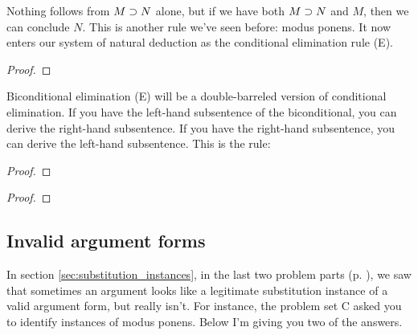 Nothing follows from $M\supset N$ alone, but if we have both $M \supset N$ and $M$, then we can conclude $N$. This is another rule we've seen before: modus ponens. It now enters our system of 
natural deduction as the conditional elimination rule ({\eif}E).

\begin{proof}
	 
\end{proof}

Biconditional elimination ({\eiff}E) will be a double-barreled version of conditional elimination. If you have the left-hand subsentence of the biconditional, you can derive the 
right-hand subsentence. If you have the right-hand subsentence, you can derive the left-hand subsentence. This is the rule:

\begin{multicols}{2}
\begin{proof}
	 
\end{proof}

\begin{proof}
	 
\end{proof}
\end{multicols}

\subsection{Invalid argument forms}


In section \ref{sec:substitution_instances}, in the last two problem parts (p. \pageref{sec4.1partC}), we saw that sometimes an argument looks like a legitimate substitution instance of a 
valid argument form, but really isn't.  For instance, the problem set C asked you to identify instances of modus ponens. Below I'm giving you two of the answers.
 
